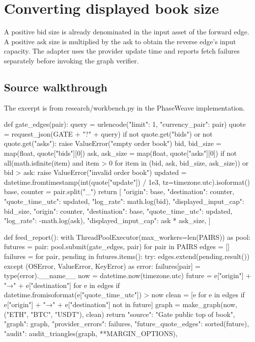\documentclass[11pt,oneside,openany]{book}
\begin{document}
\chapter{Converting displayed book size}
A positive bid size is already denominated in the input asset of the forward edge. A positive ask size is multiplied by the ask to obtain the reverse edge's input capacity. The adapter uses the provider update time and reports fetch failures separately before invoking the graph verifier.

\section*{Source walkthrough}
The excerpt is from research/workbench.py in the PhaseWeave implementation.

\begin{BookCode}
def gate_edges(pair):
    query = urlencode({"limit": 1, "currency_pair": pair})
    quote = request_json(GATE + "?" + query)
    if not quote.get("bids") or not quote.get("asks"):
        raise ValueError("empty order book")
    bid, bid_size = map(float, quote["bids"][0])
    ask, ask_size = map(float, quote["asks"][0])
    if not all(math.isfinite(item) and item > 0 for item in (bid, ask, bid_size, ask_size)) or bid > ask:
        raise ValueError("invalid order book")
    updated = datetime.fromtimestamp(int(quote["update"]) / 1e3, tz=timezone.utc).isoformat()
    base, counter = pair.split("_")
    return [
        {"origin": base, "destination": counter, "quote_time_utc": updated,
         "log_rate": math.log(bid), "displayed_input_cap": bid_size},
        {"origin": counter, "destination": base, "quote_time_utc": updated,
         "log_rate": -math.log(ask), "displayed_input_cap": ask * ask_size},
    ]
\end{BookCode}
\begin{BookCode}
def feed_report():
    with ThreadPoolExecutor(max_workers=len(PAIRS)) as pool:
        futures = {pair: pool.submit(gate_edges, pair) for pair in PAIRS}
        edges = []
        failures = {}
        for pair, pending in futures.items():
            try:
                edges.extend(pending.result())
            except (OSError, ValueError, KeyError) as error:
                failures[pair] = type(error).__name__
    now = datetime.now(timezone.utc)
    future = {e["origin"] + "→" + e["destination"] for e in edges if datetime.fromisoformat(e["quote_time_utc"]) > now}
    clean = [e for e in edges if e["origin"] + "→" + e["destination"] not in future]
    graph = make_graph(now, ("ETH", "BTC", "USDT"), clean)
    return {
        "source": "Gate public top of book", "graph": graph, "provider_errors": failures,
        "future_quote_edges": sorted(future), "audit": audit_triangles(graph, **MARGIN_OPTIONS),
    }
\end{BookCode}
\end{document}
